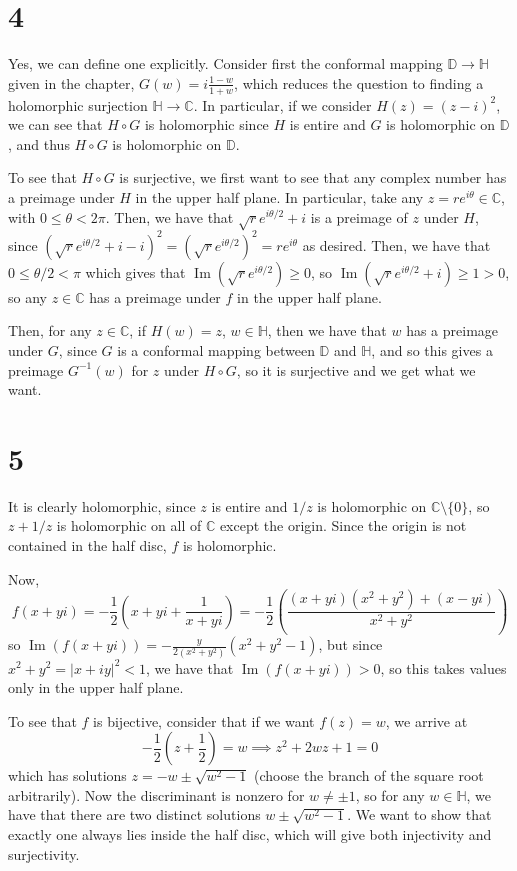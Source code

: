 \documentclass[12pt,letterpaper]{article}
\theoremstyle{definition}
\newcommand{\D}{\mathbb{D}}
\newcommand{\Ha}{\mathbb{H}}
\newcommand{\C}{\mathbb{C}}
\DeclareMathOperator{\imag}{Im}
\begin{document}
\section*{4}

Yes, we can define one explicitly. Consider first the conformal mapping $\D \rightarrow \Ha$ given in the chapter, $G(w) = i\frac{1 - w}{1 + w}$, which reduces the question to finding a holomorphic surjection $\Ha \rightarrow \C$. In particular, if we consider $H(z) = (z - i)^{2}$, we can see that $H \circ G$ is holomorphic since $H$ is entire and $G$ is holomorphic on $\D$, and thus $H \circ G$ is holomorphic on $\D$.

To see that $H \circ G$ is surjective, we first want to see that any complex number has a preimage under $H$ in the upper half plane. In particular, take any $z = re^{i\theta} \in \C$, with $0 \leq \theta < 2\pi$. Then, we have that $\sqrt{r}e^{i\theta / 2} + i$ is a preimage of $z$ under $H$, since $(\sqrt{r}e^{i\theta / 2} + i - i)^{2} = (\sqrt{r}e^{i\theta / 2})^{2} = re^{i\theta}$ as desired. Then, we have that $0 \leq \theta/2 < \pi$ which gives that $\imag(\sqrt{r}e^{i\theta / 2}) \geq 0$, so $\imag(\sqrt{r}e^{i\theta / 2} + i) \geq 1 > 0$, so any $z \in \C$ has a preimage under $f$ in the upper half plane.

Then, for any $z \in \C$, if $H(w) = z$, $w \in \Ha$, then we have that $w$ has a preimage under $G$, since $G$ is a conformal mapping between $\D$ and $\Ha$, and so this gives a preimage $G^{-1}(w)$ for $z$ under $H \circ G$, so it is surjective and we get what we want.


\section*{5}

It is clearly holomorphic, since $z$ is entire and $1/z$ is holomorphic on $\C \setminus \{0\}$, so $z + 1/z$ is holomorphic on all of $\C$ except the origin. Since the origin is not contained in the half disc, $f$ is holomorphic.

Now,
\[
  f(x + yi) = -\frac{1}{2}\left(x +yi + \frac{1}{x + yi}\right) = -\frac{1}{2}\left(\frac{(x + yi)(x^{2} + y^{2}) + (x - yi)}{x^{2} + y^{2}}\right)
\]
so $\imag(f(x +yi)) = -\frac{y}{2(x^{2} + y^{2})}(x^{2} + y^{2} - 1)$, but since $x^{2} + y^{2} = |x  + iy|^{2} < 1$, we have that $\imag(f(x + yi)) > 0$, so this takes values only in the upper half plane.

To see that $f$ is bijective, consider that if we want $f(z) = w$, we arrive at
\[
  -\frac{1}{2}\left(z + \frac{1}{2}\right) = w \implies z^{2} + 2wz + 1 = 0
\]
which has solutions $z = - w \pm \sqrt{w^{2} - 1}$ (choose the branch of the square root arbitrarily). Now the discriminant is nonzero for $w \neq \pm 1$, so for any $w \in \Ha$, we have that there are two distinct solutions $w \pm \sqrt{w^{2} - 1}$. We want to show that exactly one always lies inside the half disc, which will give both injectivity and surjectivity.
\end{document}
